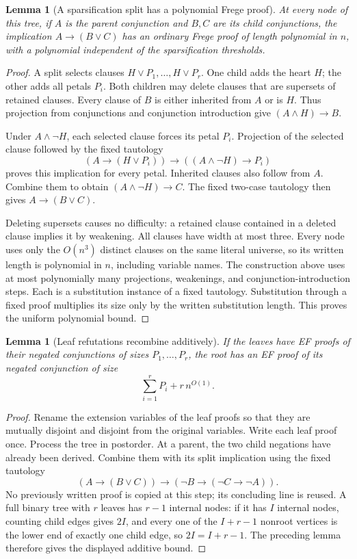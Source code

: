 \documentclass[11pt]{article}
\newtheorem{lemma}[theorem]{Lemma}
\theoremstyle{definition}
\theoremstyle{remark}
\begin{document}
\begin{lemma}[A sparsification split has a polynomial Frege proof]
\label{lem:ef-sparse-split}
At every node of this tree, if $A$ is the parent conjunction and
$B,C$ are its child conjunctions, the implication
$A\to(B\lor C)$ has an ordinary Frege proof of length
polynomial in $n$, with a polynomial independent of the
sparsification thresholds.
\end{lemma}
\begin{proof}
A split selects clauses $H\lor P_1,\ldots,H\lor P_r$.
One child adds the heart $H$; the other adds all petals $P_i$.
Both children may delete clauses that are supersets of retained
clauses. Every clause of $B$ is either inherited from $A$ or is
$H$. Thus projection from conjunctions and conjunction introduction
give $(A\land H)\to B$.

Under $A\land\neg H$, each selected clause forces its petal
$P_i$. Projection of the selected clause followed by the fixed
tautology
\[
 (A\to(H\lor P_i))\to((A\land\neg H)\to P_i)
\]
proves this implication for every petal. Inherited clauses also
follow from $A$. Combine them to obtain
$(A\land\neg H)\to C$. The fixed two-case tautology then
gives $A\to(B\lor C)$.

Deleting supersets causes no difficulty: a retained clause
contained in a deleted clause implies it by weakening. All
clauses have width at most three. Every node uses only the
$O(n^3)$ distinct clauses on the same literal universe, so its
written length is polynomial in $n$, including variable names.
The construction above uses at most polynomially many
projections, weakenings, and conjunction-introduction steps.
Each is a substitution instance of a fixed tautology. Substitution
through a fixed proof multiplies its size only by the written
substitution length. This proves the uniform polynomial bound.
\end{proof}

\begin{lemma}[Leaf refutations recombine additively]
\label{lem:ef-sparse-combine}
If the leaves have EF proofs of their negated conjunctions of
sizes $P_1,\ldots,P_r$, the root has an EF proof of its negated
conjunction of size
\[
 \sum_{i=1}^{r}P_i+r\,n^{O(1)}.
\]
\end{lemma}
\begin{proof}
Rename the extension variables of the leaf proofs so that they are
mutually disjoint and disjoint from the original variables. Write
each leaf proof once. Process the tree in postorder. At a parent,
the two child negations have already been derived. Combine them
with its split implication using the fixed tautology
\[
 (A\to(B\lor C))\to(\neg B\to(\neg C\to\neg A)).
\]
No previously written proof is copied at this step; its concluding
line is reused. A full binary tree with $r$ leaves has $r-1$
internal nodes: if it has $I$ internal nodes, counting child edges
gives $2I$, and every one of the $I+r-1$ nonroot vertices is the
lower end of exactly one child edge, so $2I=I+r-1$. The preceding
lemma therefore gives the displayed additive bound.
\end{proof}
\end{document}
